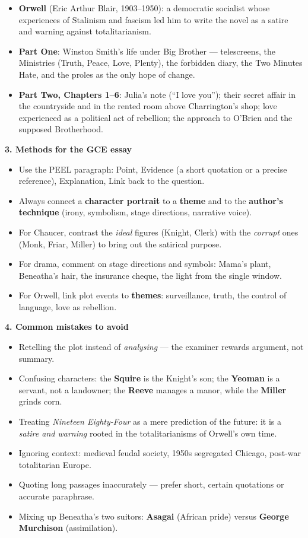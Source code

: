 \documentclass[11pt]{article}
\newcommand{\cle}[1]{{\popxbold\color{popdark}#1}}
\begin{document}
\begin{bilan}
\begin{itemize}
  \item \textbf{Orwell} (Eric Arthur Blair, 1903--1950): a democratic socialist whose experiences of Stalinism and fascism led him to write the novel as a satire and warning against totalitarianism.
  \item \textbf{Part One}: Winston Smith's life under Big Brother --- telescreens, the Ministries (Truth, Peace, Love, Plenty), the forbidden diary, the Two Minutes Hate, and the proles as the only hope of change.
  \item \textbf{Part Two, Chapters 1--6}: Julia's note (``I love you''); their secret affair in the countryside and in the rented room above Charrington's shop; love experienced as a political act of rebellion; the approach to O'Brien and the supposed Brotherhood.
\end{itemize}

\textbf{3. Methods for the GCE essay}
\begin{itemize}
  \item Use the \cle{PEEL} paragraph: Point, Evidence (a short quotation or a precise reference), Explanation, Link back to the question.
  \item Always connect a \textbf{character portrait} to a \textbf{theme} and to the \textbf{author's technique} (irony, symbolism, stage directions, narrative voice).
  \item For Chaucer, contrast the \emph{ideal} figures (Knight, Clerk) with the \emph{corrupt} ones (Monk, Friar, Miller) to bring out the satirical purpose.
  \item For drama, comment on \cle{stage directions} and \cle{symbols}: Mama's plant, Beneatha's hair, the insurance cheque, the light from the single window.
  \item For Orwell, link plot events to \textbf{themes}: surveillance, truth, the control of language, love as rebellion.
\end{itemize}

\textbf{4. Common mistakes to avoid}
\begin{itemize}
  \item Retelling the plot instead of \emph{analysing} --- the examiner rewards argument, not summary.
  \item Confusing characters: the \textbf{Squire} is the Knight's son; the \textbf{Yeoman} is a servant, not a landowner; the \textbf{Reeve} manages a manor, while the \textbf{Miller} grinds corn.
  \item Treating \emph{Nineteen Eighty-Four} as a mere prediction of the future: it is a \emph{satire and warning} rooted in the totalitarianisms of Orwell's own time.
  \item Ignoring context: medieval feudal society, 1950s segregated Chicago, post-war totalitarian Europe.
  \item Quoting long passages inaccurately --- prefer short, certain quotations or accurate paraphrase.
  \item Mixing up Beneatha's two suitors: \textbf{Asagai} (African pride) versus \textbf{George Murchison} (assimilation).
\end{itemize}


\end{bilan}
\end{document}
